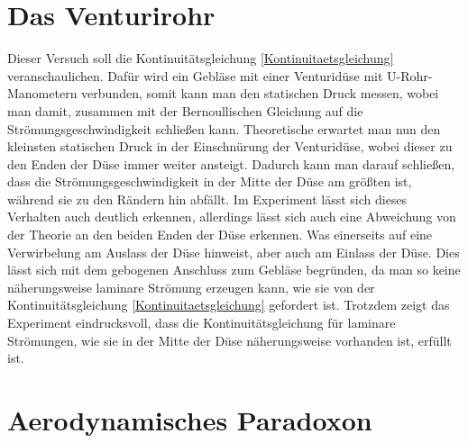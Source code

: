 \section{Das Venturirohr}

Dieser Versuch soll die Kontinuitätsgleichung \ref{Kontinuitaetsgleichung} veranschaulichen. Dafür wird ein Gebläse mit einer Venturidüse mit U-Rohr-Manometern verbunden, somit kann man den statischen Druck messen, wobei man damit, zusammen mit der Bernoullischen Gleichung auf die Strömungsgeschwindigkeit schließen kann. Theoretische erwartet man nun den kleinsten statischen Druck in der Einschnürung der Venturidüse, wobei dieser zu den Enden der Düse immer weiter ansteigt. Dadurch kann man darauf schließen, dass die Strömungsgeschwindigkeit in der Mitte der Düse am größten ist, während sie zu den Rändern hin abfällt. Im Experiment lässt sich dieses Verhalten auch deutlich erkennen, allerdings lässt sich auch eine Abweichung von der Theorie an den beiden Enden der Düse erkennen. Was einerseits auf eine Verwirbelung am Auslass der Düse hinweist, aber auch am Einlass der Düse. Dies lässt sich mit dem gebogenen Anschluss zum Gebläse begründen, da man so keine näherungsweise laminare Strömung erzeugen kann, wie sie von der Kontinuitätsgleichung \ref{Kontinuitaetsgleichung} gefordert ist. Trotzdem zeigt das Experiment eindrucksvoll, dass die Kontinuitätsgleichung für laminare Strömungen, wie sie in der Mitte der Düse näherungsweise vorhanden ist, erfüllt ist.

\section{Aerodynamisches Paradoxon}

